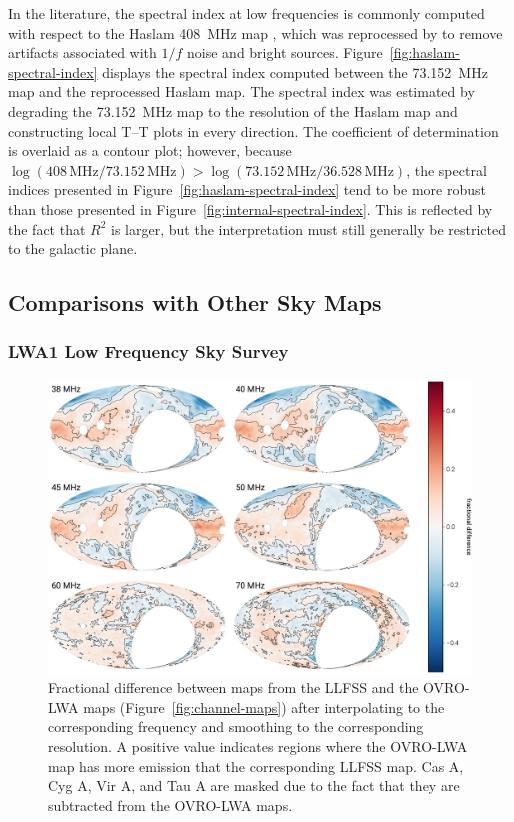 \documentclass[twocolumn]{aastex61}
\begin{document}
In the literature, the spectral index at low frequencies is commonly computed with respect to the
Haslam 408~MHz map \citep{1981A&A...100..209H, 1982A&AS...47....1H}, which was reprocessed by
\citet{2015MNRAS.451.4311R} to remove artifacts associated with $1/f$ noise and bright sources.
Figure~\ref{fig:haslam-spectral-index} displays the spectral index computed between the 73.152~MHz
map and the reprocessed Haslam map. The spectral index was estimated by degrading the 73.152~MHz map
to the resolution of the Haslam map and constructing local T--T plots in every direction. The
coefficient of determination is overlaid as a contour plot; however, because
$\log(408\,\text{MHz}/73.152\,\text{MHz}) > \log(73.152\,\text{MHz}/36.528\,\text{MHz})$, the
spectral indices presented in Figure~\ref{fig:haslam-spectral-index} tend to be more robust than
those presented in Figure~\ref{fig:internal-spectral-index}. This is reflected by the fact that
$R^2$ is larger, but the interpretation must still generally be restricted to the galactic plane.

\subsection{Comparisons with Other Sky Maps}\label{sec:compare}

\subsubsection{LWA1 Low Frequency Sky Survey}

\begin{figure}[t]
    \centering
    \includegraphics[width=\textwidth]{figures/lwa1/lwa1}
    \caption{
        Fractional difference between maps from the LLFSS and the OVRO-LWA maps
        (Figure~\ref{fig:channel-maps}) after interpolating to the corresponding frequency and
        smoothing to the corresponding resolution. A positive value indicates regions where the
        OVRO-LWA map has more emission that the corresponding LLFSS map. Cas A, Cyg A, Vir A, and
        Tau A are masked due to the fact that they are subtracted from the OVRO-LWA maps.
    }
    \label{fig:lwa1-comparison}
\end{figure}
\end{document}
